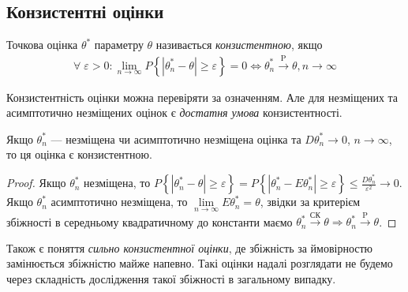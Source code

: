\subsection{Конзистентні оцінки}
\begin{definition}
    Точкова оцінка $\theta^*$ параметру $\theta$ називається \emph{конзистентною}, якщо
    \begin{gather}\label{estim_consis}
        \forall \; \varepsilon > 0: \underset{n \to \infty}{\lim} P\left\{|\theta^*_n - \theta| \geq \varepsilon\right\}= 0
        \Leftrightarrow \theta^*_n \overset{\mathrm{P}}{\longrightarrow} \theta, n \to \infty
    \end{gather}
\end{definition}
Конзистентність оцінки можна перевіряти за означенням. Але для незміщених та асимптотично незміщених оцінок є
\emph{достатня умова} конзистентності.
\begin{proposition*}
    Якщо $\theta^*_n$ --- незміщена чи асимптотично незміщена оцінка та $D\theta^*_n \to 0$, $n \to \infty$,
    то ця оцінка є конзистентною.
\end{proposition*}
\begin{proof}
    Якщо $\theta^*_n$ незміщена, то 
    $P\left\{|\theta^*_n - \theta| \geq \varepsilon\right\}=P\left\{|\theta^*_n - E\theta^*_n| \geq \varepsilon\right\} 
    \leq \frac{D\theta^*_n}{\varepsilon^2} \to 0$.
    Якщо $\theta^*_n$ асимптотично незміщена, то $\underset{n\to\infty}{\lim} E\theta^*_n = \theta$,
    звідки за критерієм збіжності в середньому квадратичному до константи маємо 
    $\theta^*_n \overset{\text{СК}}{\longrightarrow} \theta \Rightarrow \theta^*_n \overset{\mathrm{P}}{\longrightarrow} \theta$.
\end{proof}
\begin{remark}
    Також є поняття \emph{сильно конзистентної оцінки}, де збіжність за ймовірностю замінюється збіжністю майже напевно.
    Такі оцінки надалі розглядати не будемо через складність дослідження такої збіжності в загальному випадку. 
\end{remark}
